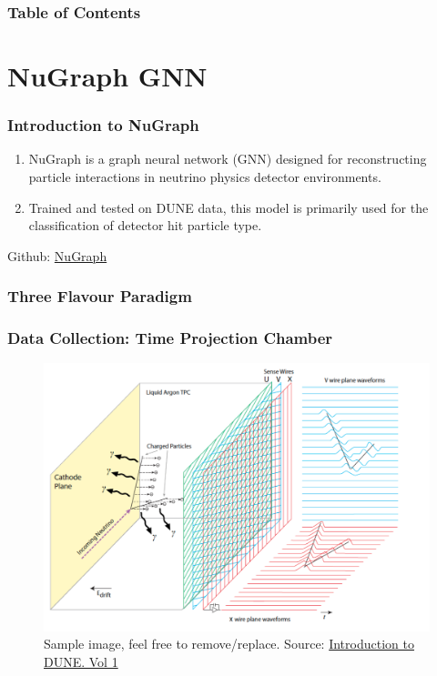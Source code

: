 \documentclass{beamer}
\title{\subtitle{Binary Classification Model for Decay Events}}
\author{Prince Bhaura, Yijie Wang, Murdock Aubry}
\institute{University of Toronto}
\date{\today}
\begin{document}
\frame{\titlepage}

\begin{frame}
	\frametitle{Table of Contents}
	\tableofcontents
\end{frame}





\section{NuGraph GNN}

\begin{frame}
	\frametitle{Introduction to NuGraph}
		\begin{enumerate} 
			\item NuGraph is a graph neural network (GNN) designed for reconstructing particle interactions in neutrino physics detector environments.

			\item Trained and tested on DUNE data, this model is primarily used for the classification of detector hit particle type.
		\end{enumerate}

		\centering
		\vspace{\fill}
		Github: \href{https://github.com/exatrkx/NuGraph/tree/main}{\color{blue} NuGraph}
\end{frame}

\begin{frame}
	\frametitle{Three Flavour Paradigm}
\end{frame}


\begin{frame}
	\frametitle{Data Collection: Time Projection Chamber}
	\begin{figure}[h!]
		\includegraphics[width=.7\textwidth]{images/LArTPC.png}
		\caption{Sample image, feel free to remove/replace. Source: \href{https://arxiv.org/abs/2002.02967}{\color{blue} Introduction to DUNE. Vol 1}}
		\label{far_detector}
	\end{figure}
\end{frame}
\end{document}
